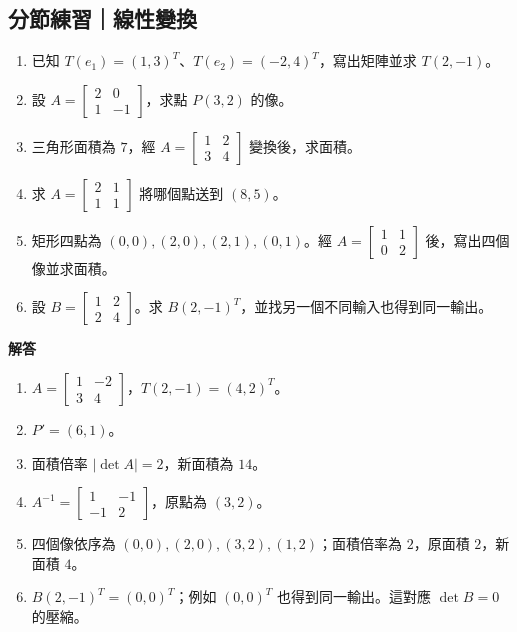 \documentclass[11pt,a4paper]{article}
\providecommand{\tightlist}{%
  \setlength{\itemsep}{0pt}\setlength{\parskip}{0pt}}
\begin{document}
\begin{HandoutSelfCheck}

\subsection{分節練習｜線性變換}\label{ux5206ux7bc0ux7df4ux7fd2ux7ddaux6027ux8b8aux63db}

\begin{enumerate}
\def\labelenumi{\arabic{enumi}.}
\tightlist
\item
  已知 \(T(e_1)=(1,3)^T\)、\(T(e_2)=(-2,4)^T\)，寫出矩陣並求 \(T(2,-1)\)。
\item
  設 \(A=\begin{bmatrix}2&0\\1&-1\end{bmatrix}\)，求點 \(P(3,2)\) 的像。
\item
  三角形面積為 \(7\)，經 \(A=\begin{bmatrix}1&2\\3&4\end{bmatrix}\) 變換後，求面積。
\item
  求 \(A=\begin{bmatrix}2&1\\1&1\end{bmatrix}\) 將哪個點送到 \((8,5)\)。
\item
  矩形四點為 \((0,0),(2,0),(2,1),(0,1)\)。經 \(A=\begin{bmatrix}1&1\\0&2\end{bmatrix}\) 後，寫出四個像並求面積。
\item
  設 \(B=\begin{bmatrix}1&2\\2&4\end{bmatrix}\)。求 \(B(2,-1)^T\)，並找另一個不同輸入也得到同一輸出。
\end{enumerate}

\textbf{解答}

\begin{enumerate}
\def\labelenumi{\arabic{enumi}.}
\tightlist
\item
  \(A=\begin{bmatrix}1&-2\\3&4\end{bmatrix}\)，\(\boxed{T(2,-1)=(4,2)^T}\)。
\item
  \(\boxed{P'=(6,1)}\)。
\item
  面積倍率 \(|\det A|=2\)，新面積為 \(\boxed{14}\)。
\item
  \(A^{-1}=\begin{bmatrix}1&-1\\-1&2\end{bmatrix}\)，原點為 \(\boxed{(3,2)}\)。
\item
  四個像依序為 \(\boxed{(0,0),(2,0),(3,2),(1,2)}\)；面積倍率為 \(2\)，原面積 \(2\)，新面積 \(\boxed{4}\)。
\item
  \(B(2,-1)^T=(0,0)^T\)；例如 \((0,0)^T\) 也得到同一輸出。這對應 \(\det B=0\) 的壓縮。
\end{enumerate}

\end{HandoutSelfCheck}
\end{document}
